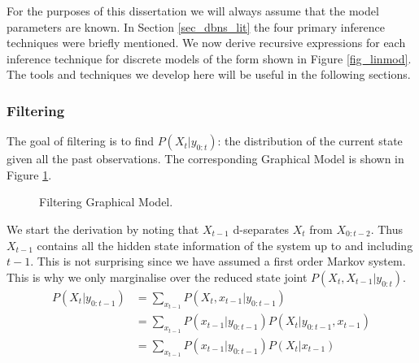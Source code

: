 For the purposes of this dissertation we will always assume that the model parameters are known. In Section \ref{sec_dbns_lit} the four primary inference techniques were briefly mentioned. We now derive recursive expressions for each inference technique for discrete models of the form shown in Figure \ref{fig_linmod}. The tools and techniques we develop here will be useful in the following sections. 

\subsubsection{Filtering}
The goal of filtering is to find $P(X_t|y_{0:t})$: the distribution of the current state given all the past observations. The corresponding Graphical Model is shown in Figure \ref{fig_linmod_filter_hmm}.
\begin{figure}[H] 
\centering
{}
\caption{Filtering Graphical Model.}
\label{fig_linmod_filter_hmm}
\end{figure}
We start the derivation by noting that $X_{t-1}$ d-separates $X_t$ from $X_{0:t-2}$. Thus $X_{t-1}$ contains all the hidden state information of the system up to and including $t-1$. This is not surprising since we have assumed a first order Markov system. This is why we only marginalise over the reduced state joint $P(X_t, X_{t-1}|y_{0:t})$.
\begin{equation}
\begin{aligned}
P(X_t| y_{0:t-1}) &= \sum_{x_{t-1}} P(X_t, x_{t-1}| y_{0:t-1})\\
&= \sum_{x_{t-1}} P(x_{t-1}|y_{0:t-1})P(X_t|y_{0:t-1}, x_{t-1})\\  
& = \sum_{x_{t-1}} P(x_{t-1}|y_{0:t-1})P(X_t|x_{t-1}) \\
\end{aligned}
\label{eq_forward_no_recur}
\end{equation}
